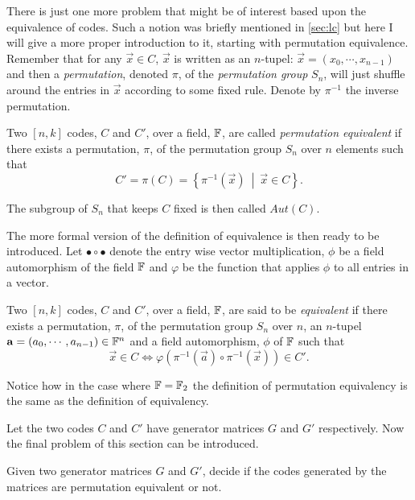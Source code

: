 There is just one more problem that might be of interest based upon the equivalence of codes. Such a notion was briefly mentioned in \cref{sec:lc} but here I will give a more proper introduction to it, starting with permutation equivalence. Remember that for any $\vec{x} \in C$, $\vec{x}$ is written as an $n$-tupel: $\vec{x} = \left(x_0, \cdots, x_{n-1}\right)$ and then a \emph{permutation}, denoted $\pi$, of the \emph{permutation group} $S_n$, will just shuffle around the entries in $\vec{x}$ according to some fixed rule. Denote by $\pi^{-1}$ the inverse permutation.
\begin{defi}
\label{def:permEquiv}
	Two $\left[n,k\right]$ codes, $C$ and $C'$, over a field, $\mathbb{F}$, are called \emph{permutation equivalent} if there exists a permutation, $\pi$, of the permutation group $S_n$ over $n$ elements such that
	\begin{equation*}
		C' = \pi \left(C\right) = \left\{ \pi^{-1}\left(\vec{x}\right) \ \middle\vert \ \vec{x} \in C \right\}.
	\end{equation*}
\end{defi}
The subgroup of $S_n$ that keeps $C$ fixed is then called $Aut\left(C\right)$.

The more formal version of the definition of equivalence is then ready to be introduced. Let $\bullet \circ \bullet$ denote the entry wise vector multiplication, $\phi$ be a field automorphism of the field $\mathbb{F}$ and $\varphi$ be the function that applies $\phi$ to all entries in a vector.
\begin{defi}[Equivalence]
\label{def:equiv}
	Two $\left[n,k\right]$ codes, $C$ and $C'$, over a field, $\mathbb{F}$, are said to be \emph{equivalent} if there exists a permutation, $\pi$, of the permutation group $S_n$ over $n$, an $n$-tupel $\boldsymbol{\mathrm{a}} = \left(a_0, \cdots, a_{n-1}\right) \in \mathbb{F}^n$ and a field automorphism, $\phi$ of $\mathbb{F}$ such that
	\begin{equation*}
		\vec{x} \in C \Leftrightarrow \varphi\left(\pi^{-1}\left(\vec{a}\right) \circ \pi^{-1}\left(\vec{x}\right)\right) \in C'.
	\end{equation*}
\end{defi}
Notice how in the case where $\mathbb{F} = \mathbb{F}_2$ the definition of permutation equivalency is the same as the definition of equivalency.

Let the two codes $C$ and $C'$ have generator matrices $G$ and $G'$ respectively. Now the final problem of this section can be introduced.
\begin{prob}
	Given two generator matrices $G$ and $G'$, decide if the codes generated by the matrices are permutation equivalent or not.
\end{prob}



